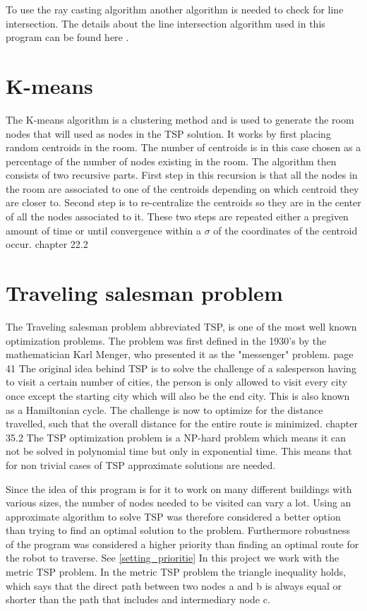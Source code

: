 To use the ray casting algorithm another algorithm is needed to check for line intersection. The details about the line intersection algorithm used in this program can be found here \cite{line_intersection}. 





\section{K-means}
The K-means algorithm is a clustering method and is used to generate the room nodes that will used as nodes in the TSP solution.
It works by first placing random centroids in the room. The number of centroids is in this case chosen as a percentage of the number of nodes existing in the room.  The algorithm then consists of two recursive parts. 
First step in this recursion is that all the nodes in the room are associated to one of the centroids depending on which centroid they are closer to.
Second step is to re-centralize the centroids so they are in the center of all the nodes associated to it. 
These two steps are repeated either a pregiven amount of time or until convergence within a $\sigma$ of the coordinates of the centroid occur. chapter 22.2 \cite{shalev2014understanding}


\section{Traveling salesman problem}\label{TSP}
The Traveling salesman problem abbreviated TSP, is one of the most well known optimization problems. The problem was first defined in the 1930's by the mathematician Karl Menger, who presented it as the "messenger" problem. page 41 \cite{schrijver2005history} 
The original idea behind TSP is to solve the challenge of a salesperson having to visit a certain number of cities, the person is only allowed to visit every city once except the starting city which will also be the end city. This is also known as a Hamiltonian cycle. The challenge is now to optimize for the distance travelled, such that the overall distance for the entire route is minimized. chapter 35.2 \cite{cormen2009introduction}
The TSP optimization problem is a NP-hard problem which means it can not be solved in polynomial time but only in exponential time. This means that for non trivial cases of TSP approximate solutions are needed. 

Since the idea of this program is for it to work on many different buildings with various sizes, the number of nodes needed to be visited can vary a lot. Using an approximate algorithm to solve TSP was therefore considered a better option than trying to find an optimal solution to the problem. 
Furthermore robustness of the program was considered a higher priority than finding an optimal route for the robot to traverse. See \ref{setting_prioritie}
In this project we work with the metric TSP problem. In the metric TSP problem the triangle inequality holds, which says that the direct path between two nodes a and b is always equal or shorter than the path that includes and intermediary node c. 



